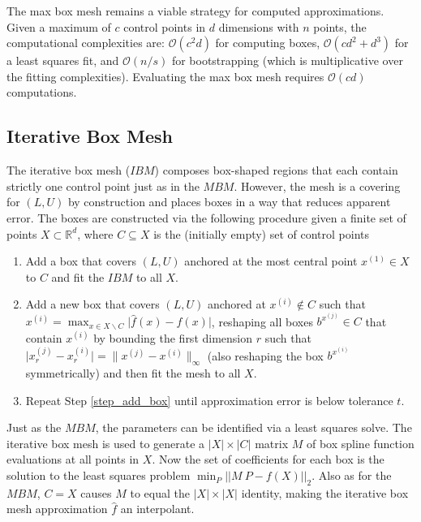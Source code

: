 The max box mesh remains a viable strategy for computed approximations. Given a maximum of $c$ control points in $d$ dimensions with $n$ points, the computational complexities are: $\mathcal{O}(c^2 d)$ for computing boxes, $\mathcal{O}(c d^2 + d^3)$ for a least squares fit, and $\mathcal{O}(n / s)$ for bootstrapping (which is multiplicative over the fitting complexities). Evaluating the max box mesh requires $\mathcal{O}(c d)$ computations.

\subsection{Iterative Box Mesh}

The iterative box mesh ($IBM$) composes box-shaped regions that each contain strictly one control point just as in the $MBM$. However, the mesh is a covering for $(L,U)$ by construction and places boxes in a way that reduces apparent error. The boxes are constructed via the following procedure given a finite set of points $X \subset \mathbb{R}^d$, where $C \subseteq X$ is the (initially empty) set of control points
\begin{enumerate}
\item Add a box that covers $(L,U)$ anchored at the most central point $x^{(1)} \in X$ to $C$ and fit the $IBM$ to all $X$.
\item Add a new box that covers $(L,U)$ anchored at $x^{(i)} \notin C$ such that $x^{(i)} = \max_{x \in X \backslash C} \bigl| \hat f(x) - f(x) \bigr|$, reshaping all boxes $b^{x^{(j)}} \in C$ that contain $x^{(i)}$ by bounding the first dimension $r$ such that $\bigl| x^{(j)}_r - x^{(i)}_r \bigr| = \bigl\| x^{(j)} - x^{(i)} \bigr\|_\infty$ (also reshaping the box $b^{x^{(i)}}$ symmetrically) and then fit the mesh to all $X$. \label{step_add_box}
\item Repeat Step \ref{step_add_box} until approximation error is below tolerance $t$.
\end{enumerate}

Just as the $MBM$, the parameters can be identified via a least squares solve. The iterative box mesh is used to generate a $|X| \times |C|$ matrix $M$ of box spline function evaluations at all points in $X$. Now the set of coefficients for each box is the solution to the least squares problem $\min_P \bigl|\bigl| M\ P - f(X) \bigr|\bigr|_2$. Also as for the $MBM$, $C = X$ causes $M$ to equal the $|X| \times |X|$ identity, making the iterative box mesh approximation $\hat f$ an interpolant.


